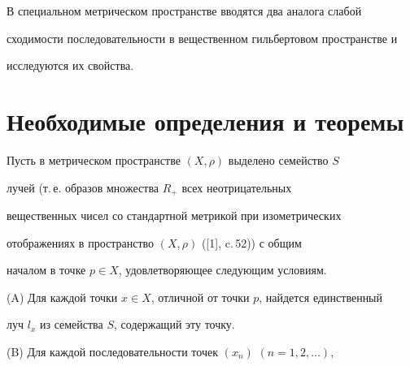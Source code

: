 \date{}




\pagestyle{plain} %







\maketitle


\label{begin}











В специальном метрическом пространстве вводятся два аналога слабой


сходимости последовательности в вещественном гильбертовом пространстве и


исследуются их свойства.








\section{Необходимые определения и теоремы}





Пусть в метрическом пространстве $(X,\rho)$ выделено семейство $S$


лучей (т.\,е. образов множества $R_{+}$ всех неотрицательных


вещественных чисел со стандартной метрикой при изометрических


отображениях в пространство $(X,\rho)$ ([1], c.\,52)) с общим


началом в точке $p \in X$, удовлетворяющее следующим условиям.





(A) Для каждой точки $x \in X$, отличной от точки $p$, найдется единственный


луч $l_{x}$ из семейства $S$, содержащий эту точку.





(B) Для каждой последовательности точек $(x_{n})$ $(n = 1, 2, \dotsc)$,


